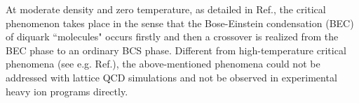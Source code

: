 \documentclass[prd, showpacs,nofootinbib,amsmath,amssymb,12pt]{revtex4}
\begin{document}
At moderate density and zero temperature, as detailed in Ref.\cite{abuki2010nambu}, the critical phenomenon takes place in the sense that the Bose-Einstein condensation (BEC) of diquark ``molecules" occurs firstly
and then a crossover is realized from the BEC phase to an ordinary BCS phase.
Different from high-temperature critical phenomena (see e.g. Ref.\cite{M2005QCD}),
the above-mentioned phenomena could not be addressed with lattice QCD simulations and not be observed in experimental heavy ion programs directly.
\end{document}
